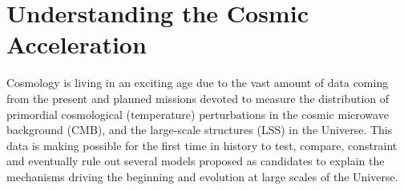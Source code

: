 \documentclass[a4paper,11pt]{article}
\begin{document}
\newpage
\section{Understanding the Cosmic Acceleration}
Cosmology is living in an exciting age due to the vast amount of data coming from the present and planned missions devoted to measure the distribution of primordial cosmological (temperature) perturbations in  the cosmic microwave background (CMB), and the large-scale structures (LSS) in the Universe. This data is making possible for the first time in history to test, compare, constraint and eventually rule out several models proposed as candidates to explain the mechanisms driving the beginning and evolution at large scales of the Universe. 
\end{document}
